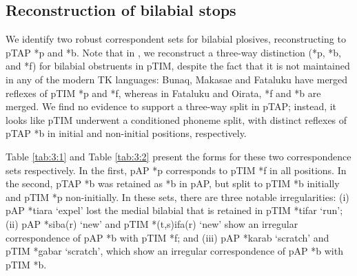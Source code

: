 \documentclass[output=paper]{LSP/langsci}
\begin{document}
\subsection{Reconstruction of bilabial stops}
We identify two robust correspondent sets for bilabial plosives, reconstructing to pTAP *p and *b. Note that in \citet{SchapperEtAl2012}, we reconstruct a three-way distinction (*p, *b, and *f) for bilabial obstruents in pTIM, despite the fact that it is not maintained in any of the modern TK languages: Bunaq, Makasae and Fataluku have merged reflexes of pTIM *p and *f, whereas in Fataluku and Oirata, *f and *b are merged. We find no evidence to support a three-way split in pTAP; instead, it looks like pTIM underwent a conditioned phoneme split, with distinct reflexes of pTAP *b in initial and non-initial positions, respectively. 

Table \ref{tab:3:1} and Table \ref{tab:3:2} present the forms for these two correspondence sets respectively. In the first, pAP *p corresponds to pTIM *f in all positions. In the second, pTAP *b was retained as *b in pAP, but split to pTIM *b initially and pTIM *p non-initially. In these sets, there are three notable irregularities: (i) pAP *tiara `expel' lost the medial bilabial that is retained in pTIM *tifar `run'; (ii) pAP *siba(r) `new' and pTIM *(t,s)ifa(r) `new' show an irregular correspondence of pAP *b with pTIM *f; and (iii) pAP *karab `scratch' and pTIM *gabar `scratch', which show an irregular correspondence of pAP *b with pTIM *b. 
 
\end{document}
